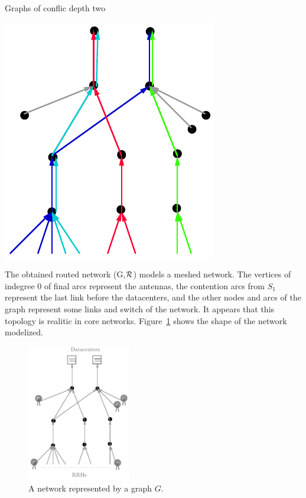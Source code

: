 \documentclass[10pt]{article}
\begin{document}
\begin{section}{Graphs of conflic depth two}
\begin{minipage}{.5\linewidth}
\end{minipage}
\begin{minipage}{.5\linewidth}
\begin{center}
\includegraphics[width=0.4\linewidth]{extendendgraph3}
\label{fig:extendendgraph3}
\end{center}
\end{minipage}
  The obtained routed network (G,$\cal{R}$) models a meshed network. The vertices of indegree $0$ of final arcs represent the antennas, the contention arcs from $S_1$ represent the last link before the datacenters, and the other nodes and arcs of the graph represent some links and switch of the network. It appears that this topology is realitic in core networks.
  Figure~\ref{fig:extendendgraphgrey} shows the shape of the network modelized.

\begin{figure}[h]
\begin{center}
 \includegraphics[width=0.4\textwidth]{extendendgraphgrey}
\caption{A network represented by a graph $G$.}\label{fig:extendendgraphgrey}
\end{center}
\end{figure}



  
  \end{section}
\end{document}
